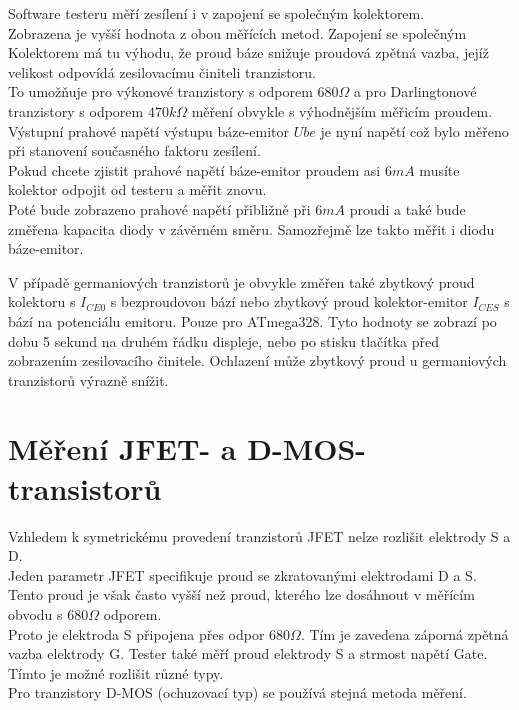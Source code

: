 Software testeru měří zesílení i v zapojení se společným kolektorem.\\
Zobrazena je vyšší hodnota z obou měřících metod.
Zapojení se společným Kolektorem má tu výhodu, že proud báze snižuje proudová zpětná vazba, jejíž velikost odpovídá zesilovacímu činiteli tranzistoru.\\
To umožňuje pro výkonové tranzistory s odporem \(680\Omega\) a pro Darlingtonové tranzistory s odporem \(470k\Omega\) měření obvykle s výhodnějším měřicím proudem.\\
Výstupní prahové napětí výstupu báze-emitor \(Ube\)  je nyní napětí což bylo měřeno při stanovení současného faktoru zesílení.\\
Pokud chcete zjistit prahové napětí báze-emitor proudem asi \(6mA\) musíte kolektor odpojit od testeru a měřit znovu.\\
Poté bude zobrazeno prahové napětí přibližně při \(6mA\) proudi a také bude změřena kapacita diody v závěrném směru.
Samozřejmě lze takto měřit i diodu  báze-emitor.

V případě germaniových tranzistorů je obvykle změřen také zbytkový proud kolektoru s \(I_{CE0}\) s bezproudovou bází nebo zbytkový proud kolektor-emitor \(I_{CES}\) s bází na potenciálu emitoru. Pouze pro ATmega328.
Tyto hodnoty se zobrazí po dobu 5 sekund na druhém řádku displeje, nebo po stisku tlačítka před zobrazením zesilovacího činitele.
Ochlazení může zbytkový proud u germaniových tranzistorů výrazně snížit. 

\section{Měření JFET- a D-MOS- transistorů}
Vzhledem k symetrickému provedení tranzistorů JFET nelze rozlišit elektrody S a D.\\
Jeden parametr JFET specifikuje proud se zkratovanými elektrodami D a S.\\
Tento proud je však často vyšší než proud, kterého lze dosáhnout v měřícím obvodu s \(680\Omega\) odporem.\\
 Proto je elektroda S připojena přes odpor \(680\Omega\). Tím je zavedena záporná zpětná vazba elektrody G.
Tester také měří proud elektrody S a strmost napětí Gate.\\
Tímto je možné rozlišit různé typy.\\
Pro tranzistory D-MOS (ochuzovací typ) se používá stejná metoda měření.

